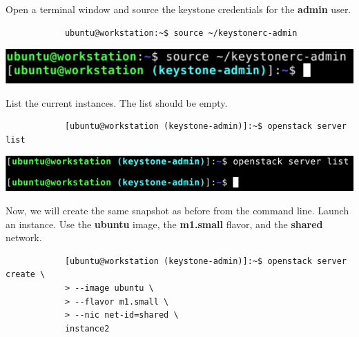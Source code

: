 \documentclass[letterpaper, 12pt]{article}
\begin{document}
\begin{enumerate}
    \begin{labstep}
        Open a terminal window and source the keystone credentials for the \textbf{admin} user.
        \begin{lstlisting}
            ubuntu@workstation:~$ source ~/keystonerc-admin
        \end{lstlisting}

        \begin{center}
            \includegraphics[width=\linewidth]{images/part2/step1.png}
        \end{center}
    \end{labstep}

    \begin{labstep}
        List the current instances.
        The list should be empty.
        \begin{lstlisting}
            [ubuntu@workstation (keystone-admin)]:~$ openstack server list
        \end{lstlisting}

        \begin{center}
            \includegraphics[width=\linewidth]{images/part2/step2.png}
        \end{center}
    \end{labstep}

    \begin{labstep}
        Now, we will create the same snapshot as before from the command line.
        Launch an instance.
        Use the \textbf{ubuntu} image, the \textbf{m1.small} flavor, and the \textbf{shared} network.
        \begin{lstlisting}
            [ubuntu@workstation (keystone-admin)]:~$ openstack server create \
            > --image ubuntu \
            > --flavor m1.small \
            > --nic net-id=shared \
            instance2
        \end{lstlisting}


\end{labstep}
\end{enumerate}
\end{document}
